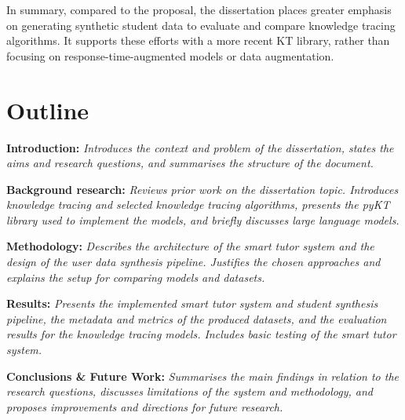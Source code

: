 In summary, compared to the proposal, the dissertation places greater emphasis on generating synthetic student data to evaluate and compare knowledge tracing algorithms. It supports these efforts with a more recent KT library, rather than focusing on response-time-augmented models or data augmentation.

\section{Outline}

\textbf{Introduction:}
\textit{Introduces the context and problem of the dissertation, states the aims and research questions, and summarises the structure of the document.}

\textbf{Background research:}
\textit{Reviews prior work on the dissertation topic. Introduces knowledge tracing and selected knowledge tracing algorithms, presents the pyKT library used to implement the models, and briefly discusses large language models.}

\textbf{Methodology:}
\textit{Describes the architecture of the smart tutor system and the design of the user data synthesis pipeline. Justifies the chosen approaches and explains the setup for comparing models and datasets.}

\textbf{Results:}
\textit{Presents the implemented smart tutor system and student synthesis pipeline, the metadata and metrics of the produced datasets, and the evaluation results for the knowledge tracing models. Includes basic testing of the smart tutor system.}

\textbf{Conclusions \& Future Work:}
\textit{Summarises the main findings in relation to the research questions, discusses limitations of the system and methodology, and proposes improvements and directions for future research.}